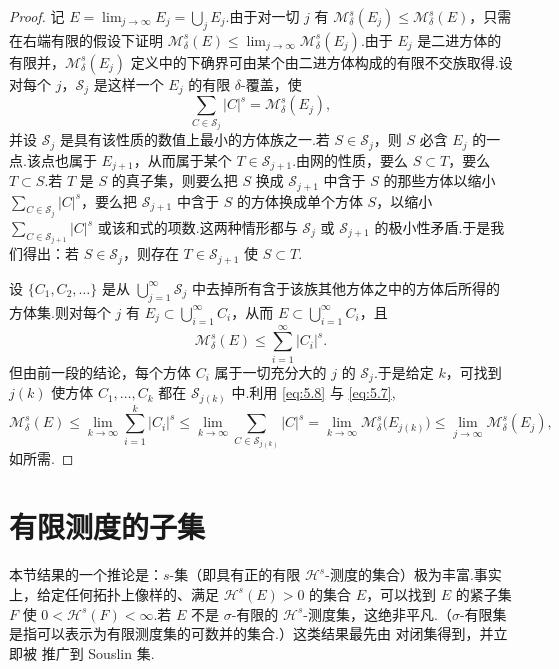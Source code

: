 \begin{proof}
记 $E=\lim_{j\to\infty}E_j=\bigcup_jE_j$.由于对一切 $j$ 有 $\mathcal{M}^s_{\delta}(E_j)\leq\mathcal{M}^s_{\delta}(E)$，只需在右端有限的假设下证明 $\mathcal{M}^s_{\delta}(E)\leq\lim_{j\to\infty}\mathcal{M}^s_{\delta}(E_j)$.由于 $E_j$ 是二进方体的有限并，$\mathcal{M}^s_{\delta}(E_j)$ 定义中的下确界可由某个由二进方体构成的有限不交族取得.设对每个 $j$，$\mathcal{S}_j$ 是这样一个 $E_j$ 的有限 $\delta$-覆盖，使
\begin{equation}\label{eq:5.7}
  \sum_{C\in\mathcal{S}_j}|C|^{s}=\mathcal{M}^{s}_{\delta}(E_j),
\end{equation}
并设 $\mathcal{S}_j$ 是具有该性质的数值上最小的方体族之一.若 $S\in\mathcal{S}_j$，则 $S$ 必含 $E_j$ 的一点.该点也属于 $E_{j+1}$，从而属于某个 $T\in\mathcal{S}_{j+1}$.由网的性质，要么 $S\subset T$，要么 $T\subset S$.若 $T$ 是 $S$ 的真子集，则要么把 $S$ 换成 $\mathcal{S}_{j+1}$ 中含于 $S$ 的那些方体以缩小 $\sum_{C\in\mathcal{S}_j}|C|^s$，要么把 $\mathcal{S}_{j+1}$ 中含于 $S$ 的方体换成单个方体 $S$，以缩小 $\sum_{C\in\mathcal{S}_{j+1}}|C|^s$ 或该和式的项数.这两种情形都与 $\mathcal{S}_j$ 或 $\mathcal{S}_{j+1}$ 的极小性矛盾.于是我们得出：若 $S\in\mathcal{S}_j$，则存在 $T\in\mathcal{S}_{j+1}$ 使 $S\subset T$.

设 $\{C_1,C_2,\ldots\}$ 是从 $\bigcup_{j=1}^{\infty}\mathcal{S}_j$ 中去掉所有含于该族其他方体之中的方体后所得的方体集.则对每个 $j$ 有 $E_j\subset\bigcup_{i=1}^{\infty}C_i$，从而 $E\subset\bigcup_{i=1}^{\infty}C_i$，且
\begin{equation}\label{eq:5.8}
  \mathcal{M}^{s}_{\delta}(E)\leq\sum_{i=1}^{\infty}|C_i|^{s}.
\end{equation}
但由前一段的结论，每个方体 $C_i$ 属于一切充分大的 $j$ 的 $\mathcal{S}_j$.于是给定 $k$，可找到 $j(k)$ 使方体 $C_1,\ldots,C_k$ 都在 $\mathcal{S}_{j(k)}$ 中.利用 \eqref{eq:5.8} 与 \eqref{eq:5.7},
\[
  \mathcal{M}^{s}_{\delta}(E)
  \leq\lim_{k\to\infty}\sum_{i=1}^{k}|C_i|^{s}
  \leq\lim_{k\to\infty}\sum_{C\in\mathcal{S}_{j(k)}}|C|^{s}
  =\lim_{k\to\infty}\mathcal{M}^{s}_{\delta}\bigl(E_{j(k)}\bigr)
  \leq\lim_{j\to\infty}\mathcal{M}^{s}_{\delta}(E_j),
\]
如所需.
\end{proof}

\section{有限测度的子集}

\label{idx:finite-measure-subsets}
本节结果的一个推论是：$s$-集（即具有正的有限 $\mathcal{H}^s$-测度的集合）极为丰富.事实上，给定任何拓扑上像样的、满足 $\mathcal{H}^s(E)>0$ 的集合 $E$，可以找到 $E$ 的紧子集 $F$ 使 $0<\mathcal{H}^s(F)<\infty$.若 $E$ 不是 $\sigma$-有限的 $\mathcal{H}^s$-测度集，这绝非平凡.（$\sigma$-有限集是指可以表示为有限测度集的可数并的集合.）这类结果最先由 \textcite{besicovitch1952} 对闭集得到，并立即被 \textcite{davies1952b} 推广到 Souslin 集.

